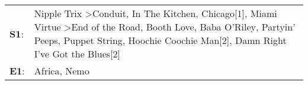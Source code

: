\begin{supertabular}{p{0.03\textwidth}p{0.92\textwidth}}
 \textbf{S1}:  &  Nipple Trix\textsuperscript{} \textgreater \enspace Conduit\textsuperscript{}, \enspace In The Kitchen\textsuperscript{}, \enspace Chicago[1]\textsuperscript{}, \enspace Miami Virtue\textsuperscript{} \textgreater \enspace End of the Road\textsuperscript{}, \enspace Booth Love\textsuperscript{}, \enspace Baba O'Riley\textsuperscript{}, \enspace Partyin' Peeps\textsuperscript{}, \enspace Puppet String\textsuperscript{}, \enspace Hoochie Coochie Man[2]\textsuperscript{}, \enspace Damn Right I've Got the Blues[2]\textsuperscript{}  \enspace  \\
 \textbf{E1}:  &                                                                                                                                                                                                                                                                                                                                                                                                                                                                                              Africa\textsuperscript{}, \enspace Nemo\textsuperscript{}  \enspace  \\
\end{supertabular}
